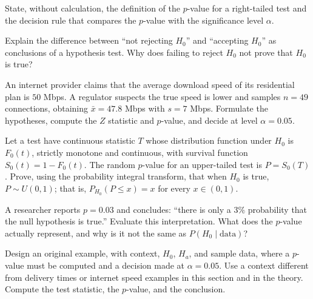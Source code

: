 \begin{problema}\label{prob:f1273a2}
State, without calculation, the definition of the $p$-value for a right-tailed test and the decision rule that compares the $p$-value with the significance level $\alpha$.
\end{problema}

\begin{problema}\label{prob:ed08255}
Explain the difference between ``not rejecting $H_0$'' and ``accepting $H_0$'' as conclusions of a hypothesis test. Why does failing to reject $H_0$ not prove that $H_0$ is true?
\end{problema}

\begin{problema}\label{prob:28d9ae6}
An internet provider claims that the average download speed of its residential plan is $50$ Mbps. A regulator suspects the true speed is lower and samples $n=49$ connections, obtaining $\bar x=47.8$ Mbps with $s=7$ Mbps. Formulate the hypotheses, compute the $Z$ statistic and $p$-value, and decide at level $\alpha=0.05$.
\end{problema}

\begin{problema}\label{prob:ff47cad}
Let a test have continuous statistic $T$ whose distribution function under $H_0$ is $F_0(t)$, strictly monotone and continuous, with survival function $S_0(t)=1-F_0(t)$. The random $p$-value for an upper-tailed test is $P=S_0(T)$. Prove, using the probability integral transform, that when $H_0$ is true, $P\sim U(0,1)$; that is, $P_{H_0}(P\le x)=x$ for every $x\in(0,1)$.
\end{problema}

\begin{problema}\label{prob:af3b6da}
A researcher reports $p=0.03$ and concludes: ``there is only a $3\%$ probability that the null hypothesis is true.'' Evaluate this interpretation. What does the $p$-value actually represent, and why is it not the same as $P(H_0\mid\text{data})$?
\end{problema}

\begin{problema}\label{prob:de31e8f}
Design an original example, with context, $H_0$, $H_a$, and sample data, where a $p$-value must be computed and a decision made at $\alpha=0.05$. Use a context different from delivery times or internet speed examples in this section and in the theory. Compute the test statistic, the $p$-value, and the conclusion.
\end{problema}


